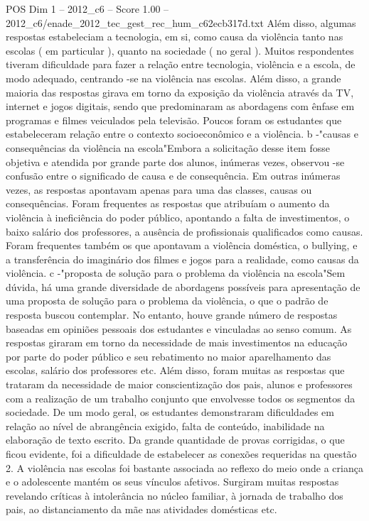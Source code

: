 \begin{textsample}{POS Dim 1 – 2012\_c6 – Score 1.00 – 2012\_c6/enade\_2012\_tec\_gest\_rec\_hum\_c62ecb317d.txt}
Além disso, algumas respostas estabeleciam a tecnologia, em si, como causa da violência tanto nas escolas ( em particular ), quanto na sociedade ( no geral ).
Muitos respondentes tiveram dificuldade para fazer a relação entre tecnologia, violência e a escola, de modo adequado, centrando -se na violência nas escolas.
Além disso, a grande maioria das respostas girava em torno da exposição da violência através da TV, internet e jogos digitais, sendo que predominaram as abordagens com ênfase em programas e filmes veiculados pela televisão.
Poucos foram os estudantes que estabeleceram relação entre o contexto socioeconômico e a violência. b -"causas e consequências da violência na escola"Embora a solicitação desse item fosse objetiva e atendida por grande parte dos alunos, inúmeras vezes, observou -se confusão entre o significado de causa e de consequência.
Em outras inúmeras vezes, as respostas apontavam apenas para uma das classes, causas ou consequências.
Foram frequentes as respostas que atribuíam o aumento da violência à ineficiência do poder público, apontando a falta de investimentos, o baixo salário dos professores, a ausência de profissionais qualificados como causas.
Foram frequentes também os que apontavam a violência doméstica, o bullying, e a transferência do imaginário dos filmes e jogos para a realidade, como causas da violência. c -"proposta de solução para o problema da violência na escola"Sem dúvida, há uma grande diversidade de abordagens possíveis para apresentação de uma proposta de solução para o problema da violência, o que o padrão de resposta buscou contemplar.
No entanto, houve grande número de respostas baseadas em opiniões pessoais dos estudantes e vinculadas ao senso comum.
As respostas giraram em torno da necessidade de mais investimentos na educação por parte do poder público e seu rebatimento no maior aparelhamento das escolas, salário dos professores etc.
Além disso, foram muitas as respostas que trataram da necessidade de maior conscientização dos pais, alunos e professores com a realização de um trabalho conjunto que envolvesse todos os segmentos da sociedade.
De um modo geral, os estudantes demonstraram dificuldades em relação ao nível de abrangência exigido, falta de conteúdo, inabilidade na elaboração de texto escrito.
Da grande quantidade de provas corrigidas, o que ficou evidente, foi a dificuldade de estabelecer as conexões requeridas na questão 2.
A violência nas escolas foi bastante associada ao reflexo do meio onde a criança e o adolescente mantém os seus vínculos afetivos.
Surgiram muitas respostas revelando críticas à intolerância no núcleo familiar, à jornada de trabalho dos pais, ao distanciamento da mãe nas atividades domésticas etc.

\end{textsample}

